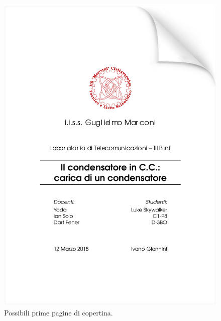 \begin{landscape}
\begin{figure}[htp]
		\includegraphics[width=0.65\textheight]{figure/frontpage_2.pdf}%
	\caption{Possibili prime pagine di copertina.}
	\label{fig:fpage}
\end{figure}
\end{landscape}






























